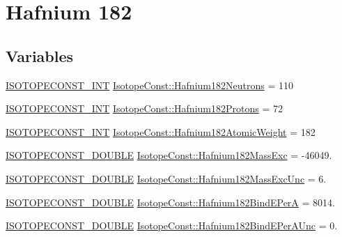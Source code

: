 \hypertarget{group___isotope_const-_hafnium-_hf182}{}\section{Hafnium 182}
\label{group___isotope_const-_hafnium-_hf182}
\subsection*{Variables}
\begin{DoxyCompactItemize}
\item 
\mbox{\hyperlink{group___isotope_const-_macros_ga5f18360b3e99483a35c32d789e62621c}{I\+S\+O\+T\+O\+P\+E\+C\+O\+N\+S\+T\+\_\+\+I\+NT}} \mbox{\hyperlink{group___isotope_const-_hafnium-_hf182_gae81f9a32bcfcb0311eedac863e6f97e0}{Isotope\+Const\+::\+Hafnium182\+Neutrons}} = 110
\item 
\mbox{\hyperlink{group___isotope_const-_macros_ga5f18360b3e99483a35c32d789e62621c}{I\+S\+O\+T\+O\+P\+E\+C\+O\+N\+S\+T\+\_\+\+I\+NT}} \mbox{\hyperlink{group___isotope_const-_hafnium-_hf182_gad764ab6a912fa7320615e8014174d224}{Isotope\+Const\+::\+Hafnium182\+Protons}} = 72
\item 
\mbox{\hyperlink{group___isotope_const-_macros_ga5f18360b3e99483a35c32d789e62621c}{I\+S\+O\+T\+O\+P\+E\+C\+O\+N\+S\+T\+\_\+\+I\+NT}} \mbox{\hyperlink{group___isotope_const-_hafnium-_hf182_ga13edc5ca48dd664ea524302e302d21d5}{Isotope\+Const\+::\+Hafnium182\+Atomic\+Weight}} = 182
\item 
\mbox{\hyperlink{group___isotope_const-_macros_ga8f45a7272ce02c0b4c65c44636ed719a}{I\+S\+O\+T\+O\+P\+E\+C\+O\+N\+S\+T\+\_\+\+D\+O\+U\+B\+LE}} \mbox{\hyperlink{group___isotope_const-_hafnium-_hf182_ga7b9a8e913aa790181a5f8e7431c7b26d}{Isotope\+Const\+::\+Hafnium182\+Mass\+Exc}} = -\/46049.
\item 
\mbox{\hyperlink{group___isotope_const-_macros_ga8f45a7272ce02c0b4c65c44636ed719a}{I\+S\+O\+T\+O\+P\+E\+C\+O\+N\+S\+T\+\_\+\+D\+O\+U\+B\+LE}} \mbox{\hyperlink{group___isotope_const-_hafnium-_hf182_ga6b60bbaaa3ab13efe3e06990789cf5bb}{Isotope\+Const\+::\+Hafnium182\+Mass\+Exc\+Unc}} = 6.
\item 
\mbox{\hyperlink{group___isotope_const-_macros_ga8f45a7272ce02c0b4c65c44636ed719a}{I\+S\+O\+T\+O\+P\+E\+C\+O\+N\+S\+T\+\_\+\+D\+O\+U\+B\+LE}} \mbox{\hyperlink{group___isotope_const-_hafnium-_hf182_ga8dcd8535238c7a656537b57c3f24f878}{Isotope\+Const\+::\+Hafnium182\+Bind\+E\+PerA}} = 8014.
\item 
\mbox{\hyperlink{group___isotope_const-_macros_ga8f45a7272ce02c0b4c65c44636ed719a}{I\+S\+O\+T\+O\+P\+E\+C\+O\+N\+S\+T\+\_\+\+D\+O\+U\+B\+LE}} \mbox{\hyperlink{group___isotope_const-_hafnium-_hf182_ga1ba1ae605e4f9bd6d550957dbd2dba4c}{Isotope\+Const\+::\+Hafnium182\+Bind\+E\+Per\+A\+Unc}} = 0.

\end{DoxyCompactItemize}
